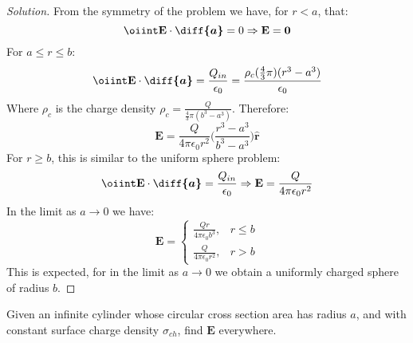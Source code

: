 \documentclass[crop=false,class=article,oneside]{standalone}
\begin{document}
    \begin{proof}[Solution]
        From the symmetry of the problem we have, for $r<a$, that:
        \begin{equation*}
            \oiint\mathbf{E}\cdot\boldsymbol{\diff{a}}
            =0\Rightarrow\mathbf{E}=\mathbf{0}
        \end{equation*}
        For $a\leq{r}\leq{b}$:
        \begin{equation*}
            \oiint\mathbf{E}\cdot\boldsymbol{\diff{a}}
            =\frac{Q_{in}}{\epsilon_{0}}
            =\frac{\rho_{c}(\frac{4}{3}\pi)(r^{3}-a^{3})}
                  {\epsilon_0}    
        \end{equation*}
        Where $\rho_{c}$ is the charge density
        $\rho_{c}=\frac{Q}{\frac{4}{3}\pi(b^{3}-a^{3})}$.
        Therefore:
        \begin{equation*}
            \mathbf{E}
            =\frac{Q}{4\pi\epsilon_{0}r^{2}}
            \bigg(\frac{r^{3}-a^{3}}{b^{3}-a^{3}}\bigg)
            \hat{\mathbf{r}}    
        \end{equation*}
        For $r\geq b$, this is similar to the uniform sphere problem:
        \begin{equation*}
            \oiint\mathbf{E}\cdot\boldsymbol{\diff{a}}
            =\frac{Q_{in}}{\epsilon_{0}}
            \Rightarrow\mathbf{E}
            =\frac{Q}{4\pi\epsilon_{0}r^{2}}
        \end{equation*}
        In the limit as $a\rightarrow 0$ we have:
        \begin{equation*}
            \mathbf{E}=
            \begin{cases}
                \frac{Qr}{4\pi\epsilon_{0}b^{3}},&r\leq b\\
                \frac{Q}{4\pi\epsilon_{0}r^{2}},&r>b
            \end{cases}
        \end{equation*}
        This is expected, for in the limit as
        $a\rightarrow 0$ we obtain a uniformly
        charged sphere of radius $b$.
    \end{proof}
    \begin{problem}[Wangsness 4-7]
        Given an infinite cylinder whose circular
        cross section area has radius $a$, and with
        constant surface charge density $\sigma_{ch}$,
        find $\mathbf{E}$ everywhere.
    \end{problem}
\end{document}
